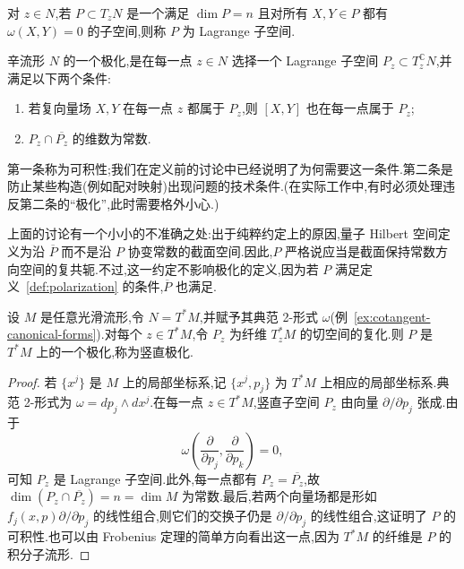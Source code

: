 \begin{definition}
\label{def:lagrangian-subspace}
对 $z\in N$,若 $P\subset T_zN$ 是一个满足 $\dim P=n$ 且对所有 $X,Y\in P$ 都有 $\omega(X,Y)=0$ 的子空间,则称 $P$ 为 Lagrange 子空间.
\end{definition}

\begin{definition}[极化]
\label{def:polarization}
辛流形 $N$ 的一个极化,是在每一点 $z\in N$ 选择一个 Lagrange 子空间 $P_z\subset T_z^{\mathbb C} N$,并满足以下两个条件:
\begin{enumerate}
\item 若复向量场 $X,Y$ 在每一点 $z$ 都属于 $P_z$,则 $[X,Y]$ 也在每一点属于 $P_z$;
\item $P_z\cap\overline{P_z}$ 的维数为常数.
\end{enumerate}
第一条称为可积性;我们在定义前的讨论中已经说明了为何需要这一条件.第二条是防止某些构造(例如配对映射)出现问题的技术条件.(在实际工作中,有时必须处理违反第二条的“极化”,此时需要格外小心.)
\end{definition}

上面的讨论有一个小小的不准确之处:出于纯粹约定上的原因,量子 Hilbert 空间定义为沿 $\overline P$ 而不是沿 $P$ 协变常数的截面空间.因此,$P$ 严格说应当是截面保持常数方向空间的复共轭.不过,这一约定不影响极化的定义,因为若 $P$ 满足定义~\ref{def:polarization} 的条件,$\overline P$ 也满足.

\begin{example}[余切丛的竖直极化]
\label{ex:vertical-polarization}
设 $M$ 是任意光滑流形,令 $N=T^*M$,并赋予其典范 2-形式 $\omega$(例~\ref{ex:cotangent-canonical-forms}).对每个 $z\in T^*M$,令 $P_z$ 为纤维 $T_z^*M$ 的切空间的复化.则 $P$ 是 $T^*M$ 上的一个极化,称为竖直极化.
\end{example}

\begin{proof}
若 $\{x^j\}$ 是 $M$ 上的局部坐标系,记 $\{x^j,p_j\}$ 为 $T^*M$ 上相应的局部坐标系.典范 2-形式为 $\omega=dp_j\wedge dx^j$.在每一点 $z\in T^*M$,竖直子空间 $P_z$ 由向量 $\partial/\partial p_j$ 张成.由于
\[
 \omega\left(\frac{\partial}{\partial p_j},\frac{\partial}{\partial p_k}\right)=0,
\]
可知 $P_z$ 是 Lagrange 子空间.此外,每一点都有 $P_z=\overline{P_z}$,故 $\dim(P_z\cap\overline{P_z})=n=\dim M$ 为常数.最后,若两个向量场都是形如 $f_j(x,p)\partial/\partial p_j$ 的线性组合,则它们的交换子仍是 $\partial/\partial p_j$ 的线性组合,这证明了 $P$ 的可积性.也可以由 Frobenius 定理的简单方向看出这一点,因为 $T^*M$ 的纤维是 $P$ 的积分子流形.
\end{proof}

